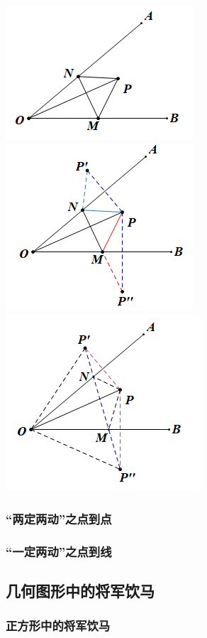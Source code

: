 \includegraphics[scale=0.6]{figure/2-2.PNG}
\includegraphics[scale=0.6]{figure/2-3.PNG}
\includegraphics[scale=0.6]{figure/2-4.PNG}
\subsubsection{“两定两动”之点到点}


\subsubsection{“一定两动”之点到线}
\subsection{几何图形中的将军饮马}
\subsubsection{正方形中的将军饮马}

